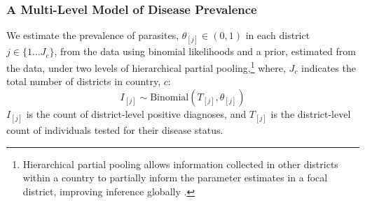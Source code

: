 \documentclass[12pt]{article}
\begin{document}
\subsubsection{A Multi-Level Model of Disease Prevalence}
	We estimate the prevalence of parasites, $\theta_{[j]} \in (0,1)$ in each district  $j\in \{1\dots J_c\}$, from the data using binomial likelihoods and a prior, estimated from the data, under two levels of hierarchical partial pooling,\footnote{Hierarchical partial pooling allows information collected in other districts within a country to partially inform the parameter estimates in a focal district, improving inference globally \citep{gelman2006data}.} where, $J_c$ indicates the total number of districts in country, $c$:
\begin{equation}
I_{[j]} \sim \text{Binomial}(T_{[j]},\theta_{[j]})
\end{equation}
 $I_{[j]}$ is the count of district-level positive diagnoses, and $T_{[j]}$ is the district-level count of individuals tested for their disease status.
\end{document}
